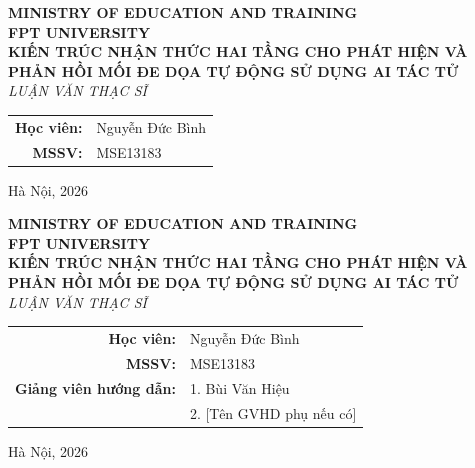 \documentclass[12pt,a4paper]{report}
\begin{document}

\pagestyle{empty}

\begin{titlepage}
    \centering
    \vspace*{1cm}
    {\large\textbf{MINISTRY OF EDUCATION AND TRAINING}}\\[0.3cm]
    {\large\textbf{FPT UNIVERSITY}}\\[2.5cm]
    
    {\Large\textbf{KIẾN TRÚC NHẬN THỨC HAI TẦNG CHO PHÁT HIỆN VÀ PHẢN HỒI MỐI ĐE DỌA TỰ ĐỘNG SỬ DỤNG AI TÁC TỬ}}\\[2.5cm]
    
    {\large\textit{LUẬN VĂN THẠC SĨ}}\\[4cm]
    
    \begin{tabular}{rl}
        \textbf{Học viên:} & Nguyễn Đức Bình \\
        \textbf{MSSV:}     & MSE13183 \\
    \end{tabular}
    
    \vfill
    {\normalsize Hà Nội, 2026}
\end{titlepage}

\begin{titlepage}
    \centering
    \vspace*{1cm}
    {\large\textbf{MINISTRY OF EDUCATION AND TRAINING}}\\[0.3cm]
    {\large\textbf{FPT UNIVERSITY}}\\[2.5cm]
    
    {\Large\textbf{KIẾN TRÚC NHẬN THỨC HAI TẦNG CHO PHÁT HIỆN VÀ PHẢN HỒI MỐI ĐE DỌA TỰ ĐỘNG SỬ DỤNG AI TÁC TỬ}}\\[2.5cm]
    
    {\large\textit{LUẬN VĂN THẠC SĨ}}\\[3cm]
    
    \begin{tabular}{rl}
        \textbf{Học viên:} & Nguyễn Đức Bình \\
        \textbf{MSSV:}     & MSE13183 \\[0.5cm]
        \textbf{Giảng viên hướng dẫn:} & 1. Bùi Văn Hiệu \\
                                      & 2. [Tên GVHD phụ nếu có] \\
    \end{tabular}
    
    \vfill
    {\normalsize Hà Nội, 2026}
\end{titlepage}
\end{document}
